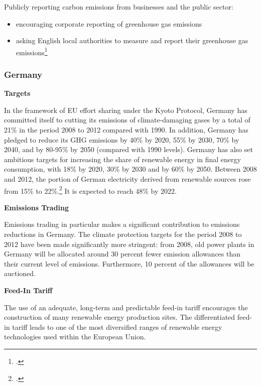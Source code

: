Publicly reporting carbon emissions from businesses and the public sector:
\begin{itemize}
	\item encouraging corporate reporting of greenhouse gas emissions
	\item asking English local authorities to measure and report their greenhouse gas emissions\footcite[][]{UKgovnt}
\end{itemize}



	\subsubsection{Germany}
	
	

\textbf{Targets}



In the framework of EU effort sharing under the Kyoto Protocol, Germany has committed itself to cutting its emissions of climate-damaging gases by a total of 21\% in the period 2008 to 2012 compared with 1990. 
In addition, Germany has pledged to reduce its GHG emissions by 40\% by 2020, 55\% by 2030, 70\% by 2040, and by 80-95\% by 2050 (compared with 1990 levels).  
Germany has also set ambitious targets for increasing the share of renewable energy in final energy consumption, with 18\% by 2020, 30\% by 2030 and by 60\% by 2050.
Between 2008 and 2012, the portion of German electricity derived from renewable sources rose from 15\% to 22\%.\footcite[][p. 12]{EconWindmills}
It is expected to reach 48\% by 2022.



\textbf{Emissions Trading}



Emissions trading in particular makes a significant contribution to emissions reductions in Germany. 
The climate protection targets for the period 2008 to 2012 have been made significantly more stringent: from 2008, old power plants in Germany will be allocated around 30 percent fewer emission allowances than their current level of emissions. Furthermore, 10 percent of the allowances will be auctioned. 



\textbf{Feed-In Tariff}



The use of an adequate, long-term and predictable feed-in tariff encourages the construction of many renewable energy production sites. 
The differentiated feed-in tariff leads to one of the most diversified ranges of renewable energy technologies used within the European Union.



